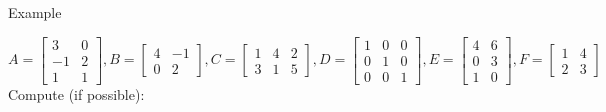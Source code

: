 \documentclass[xcoler=dvipsnames, aspectratio=169]{beamer}
\begin{document}
    \begin{frame}{Example}

        \scriptsize
        \[
            A=\begin{bmatrix}3&0\\-1&2\\1&1\end{bmatrix}, B=\begin{bmatrix}4&-1\\0&2\end{bmatrix},
            C=\begin{bmatrix}1&4&2\\3&1&5\end{bmatrix}, D = \begin{bmatrix}1&0&0\\0&1&0\\0&0&1\end{bmatrix},
            E=\begin{bmatrix}4&6\\0&3\\1&0\end{bmatrix}, F=\begin{bmatrix}1&4\\2&3\end{bmatrix}
        \]
        Compute (if possible):
        \begin{columns}
\end{columns}
\end{frame}
\end{document}
